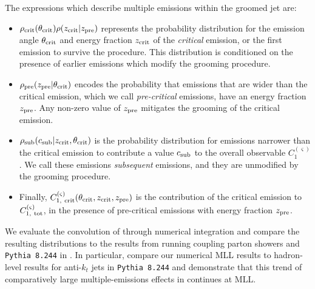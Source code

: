 The expressions which describe multiple emissions within the groomed jet are:
\begin{itemize}
\item
\(\rho_{\rm crit}(\theta_{\rm crit}) \rho(z_{\rm crit} | z_{\rm pre})\) represents the probability distribution for the emission angle \(\theta_{\rm crit}\) and energy fraction \(z_{\rm crit}\) of the \textit{critical} emission, or the first emission to survive the  procedure.
%
This distribution is conditioned on the presence of earlier emissions which modify the grooming procedure.

\item
\(\rho_{\rm pre}(z_{\rm pre} | \theta_{\rm crit})\) encodes the probability that emissions that are wider than the critical emission, which we call \textit{pre-critical} emissions, have an energy fraction \(z_{\rm pre}\).
%
%
Any non-zero value of \(z_{\rm pre}\) mitigates the grooming of the critical emission.

\item
\(\rho_{\rm sub}(c_{\rm sub} | z_{\rm crit}, \theta_{\rm crit})\) is the probability distribution for emissions narrower than the critical emission to contribute a value \(c_{\rm sub}\) to the overall observable \(C^{(\varsigma)}_1\).
%
We call these emissions \textit{subsequent} emissions, and they are unmodified by the grooming procedure.

\item
Finally, \(C^{(\varsigma)}_{1,~\rm crit}(\theta_{\rm crit},z_{\rm crit},z_{\rm pre})\) is the contribution of the critical emission to \(C^{(\varsigma)}_{1,~\rm tot}\), in the presence of pre-critical emissions with energy fraction \(z_{\rm pre}\).
\end{itemize}

We evaluate the convolution of  through numerical integration and compare the resulting distributions to the results from running coupling parton showers and \texttt{Pythia 8.244} in .
%
In particular,  compare our numerical MLL results to hadron-level results for anti-\(k_t\) jets in \texttt{Pythia 8.244} and demonstrate that this trend of comparatively large multiple-emissions effects in  continues at MLL.

